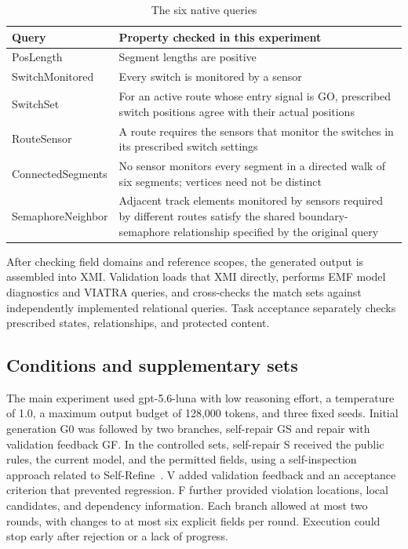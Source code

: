 \documentclass[pdflatex,iicol,sn-mathphys-num]{sn-jnl}
\newcommand{\paperref}[1]{~\citep{#1}}
\begin{document}
\begin{table}[!tbp]
\centering
\caption{The six native queries}\label{tab:C1}
\small
\setlength{\tabcolsep}{4pt}
\renewcommand{\arraystretch}{1.20}
\begin{tabularx}{\textwidth}{@{}>{\hsize}L>{\hsize}L@{}}
\toprule
\textbf{Query} & \textbf{Property checked in this experiment} \\
\midrule
PosLength & Segment lengths are positive \\
SwitchMonitored & Every switch is monitored by a sensor \\
SwitchSet & For an active route whose entry signal is GO, prescribed switch positions agree with their actual positions \\
RouteSensor & A route requires the sensors that monitor the switches in its prescribed switch settings \\
ConnectedSegments & No sensor monitors every segment in a directed walk of six segments; vertices need not be distinct \\
SemaphoreNeighbor & Adjacent track elements monitored by sensors required by different routes satisfy the shared boundary-semaphore relationship specified by the original query \\
\bottomrule
\end{tabularx}
\end{table}

After checking field domains and reference scopes, the generated output is assembled into XMI. Validation loads that XMI directly, performs EMF model diagnostics and VIATRA queries, and cross-checks the match sets against independently implemented relational queries. Task acceptance separately checks prescribed states, relationships, and protected content.


\subsection{Conditions and supplementary sets}\label{app:C-2}

The main experiment used gpt-5.6-luna with low reasoning effort, a temperature of 1.0, a maximum output budget of 128,000 tokens, and three fixed seeds. Initial generation G0 was followed by two branches, self-repair GS and repair with validation feedback GF. In the controlled sets, self-repair S received the public rules, the current model, and the permitted fields, using a self-inspection approach related to Self-Refine\paperref{NEURIPS2023_91edff07}. V added validation feedback and an acceptance criterion that prevented regression. F further provided violation locations, local candidates, and dependency information. Each branch allowed at most two rounds, with changes to at most six explicit fields per round. Execution could stop early after rejection or a lack of progress.
\end{document}
